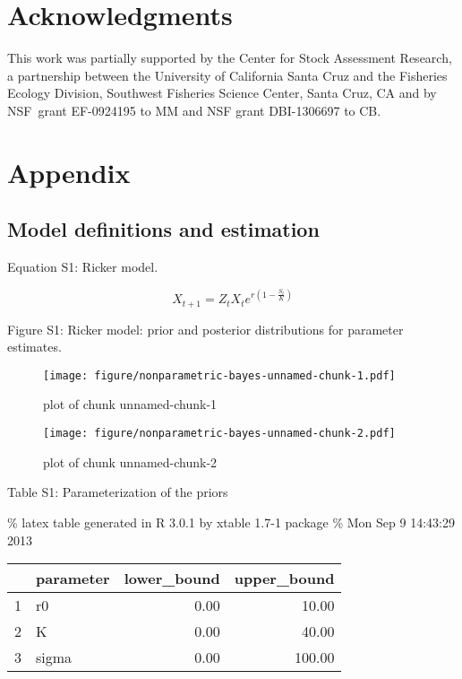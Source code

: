 \documentclass[author-year, review]{elsarticle} %
\makeatletter
\def\maxwidth{\ifdim\Gin@nat@width>\linewidth\linewidth
\else\Gin@nat@width\fi}
\let\Oldincludegraphics\includegraphics
\renewcommand{\includegraphics}[1]{\Oldincludegraphics[width=\maxwidth]{#1}}
\makeatother
\begin{document}
\section{Acknowledgments}\label{acknowledgments}

This work was partially supported by the Center for Stock Assessment
Research, a partnership between the University of California Santa Cruz
and the Fisheries Ecology Division, Southwest Fisheries Science Center,
Santa Cruz, CA and by NSF~grant EF-0924195 to MM and NSF grant
DBI-1306697 to CB.

\section{Appendix}\label{appendix}

\subsection{Model definitions and
estimation}\label{model-definitions-and-estimation}

Equation S1: Ricker model.

\[X_{t+1} = Z_t X_t e^{r \left(1 - \frac{S_t}{K} \right) } \]

Figure S1: Ricker model: prior and posterior distributions for parameter
estimates.

\begin{figure}[htbp]
\centering
\texttt{[image: figure/nonparametric-bayes-unnamed-chunk-1.pdf]}
\caption{plot of chunk unnamed-chunk-1}
\end{figure}

\begin{figure}[htbp]
\centering
\texttt{[image: figure/nonparametric-bayes-unnamed-chunk-2.pdf]}
\caption{plot of chunk unnamed-chunk-2}
\end{figure}

Table S1: Parameterization of the priors

\% latex table generated in R 3.0.1 by xtable 1.7-1 package \% Mon Sep 9
14:43:29 2013

\begin{table}[ht]
\centering
\begin{tabular}{rlrr}
  \hline
 & parameter & lower\_bound & upper\_bound \\ 
  \hline
1 & r0 & 0.00 & 10.00 \\ 
  2 & K & 0.00 & 40.00 \\ 
  3 & sigma & 0.00 & 100.00 \\ 
   \hline
\end{tabular}
\end{table}
\end{document}
